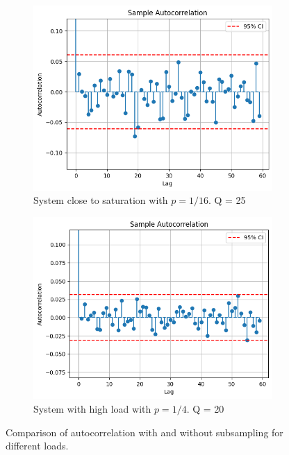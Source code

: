\begin{figure}[H]
    \vspace{10pt} %
    
    \begin{subfigure}[b]{0.45\textwidth}
        \includegraphics[width=\textwidth]{./images/04/autoCorHighFix.png}
        \caption{System close to saturation with $p=1/16$. Q = 25}
        \label{fig:autoCorHighFix}
    \end{subfigure}
    \hfill %
    \begin{subfigure}[b]{0.45\textwidth}
        \includegraphics[width=\textwidth]{./images/04/autoCorLowFix.png}
        \caption{System with high load with $p=1/4$. Q = 20}
        \label{fig:autoCorLowFix}
    \end{subfigure}
    
    \vspace{10pt} %
    \caption{Comparison of autocorrelation with and without subsampling for different loads.}
    \label{fig:autoCorComparison}
\end{figure}

